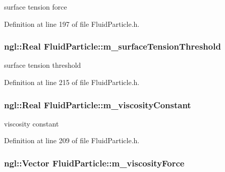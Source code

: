 surface tension force 



Definition at line 197 of file FluidParticle.h.

\hypertarget{class_fluid_particle_aaa03e2d5786c38929e8e0546c08e950c}{
\subsubsection[{m\_\-surfaceTensionThreshold}]{\setlength{\rightskip}{0pt plus 5cm}ngl::Real {\bf FluidParticle::m\_\-surfaceTensionThreshold}}}
\label{class_fluid_particle_aaa03e2d5786c38929e8e0546c08e950c}


surface tension threshold 



Definition at line 215 of file FluidParticle.h.

\hypertarget{class_fluid_particle_a3788ca2bcafe18bf8bbf59faa0146385}{
\subsubsection[{m\_\-viscosityConstant}]{\setlength{\rightskip}{0pt plus 5cm}ngl::Real {\bf FluidParticle::m\_\-viscosityConstant}}}
\label{class_fluid_particle_a3788ca2bcafe18bf8bbf59faa0146385}


viscosity constant 



Definition at line 209 of file FluidParticle.h.

\hypertarget{class_fluid_particle_a2118d5719ce2331efb1f3bc7c0650cfa}{
\subsubsection[{m\_\-viscosityForce}]{\setlength{\rightskip}{0pt plus 5cm}ngl::Vector {\bf FluidParticle::m\_\-viscosityForce}}}
\label{class_fluid_particle_a2118d5719ce2331efb1f3bc7c0650cfa}


